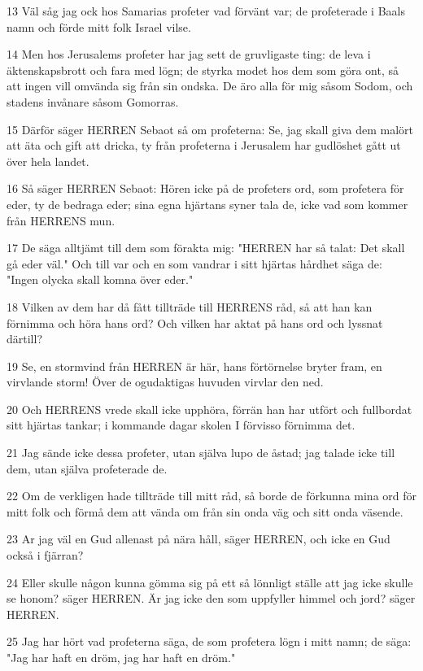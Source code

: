 \par 13 Väl såg jag ock hos Samarias profeter vad förvänt var; de profeterade i Baals namn och förde mitt folk Israel vilse.
\par 14 Men hos Jerusalems profeter har jag sett de gruvligaste ting: de leva i äktenskapsbrott och fara med lögn; de styrka modet hos dem som göra ont, så att ingen vill omvända sig från sin ondska. De äro alla för mig såsom Sodom, och stadens invånare såsom Gomorras.
\par 15 Därför säger HERREN Sebaot så om profeterna: Se, jag skall giva dem malört att äta och gift att dricka, ty från profeterna i Jerusalem har gudlöshet gått ut över hela landet.
\par 16 Så säger HERREN Sebaot: Hören icke på de profeters ord, som profetera för eder, ty de bedraga eder; sina egna hjärtans syner tala de, icke vad som kommer från HERRENS mun.
\par 17 De säga alltjämt till dem som förakta mig: "HERREN har så talat: Det skall gå eder väl." Och till var och en som vandrar i sitt hjärtas hårdhet säga de: "Ingen olycka skall komna över eder."
\par 18 Vilken av dem har då fått tillträde till HERRENS råd, så att han kan förnimma och höra hans ord? Och vilken har aktat på hans ord och lyssnat därtill?
\par 19 Se, en stormvind från HERREN är här, hans förtörnelse bryter fram, en virvlande storm! Över de ogudaktigas huvuden virvlar den ned.
\par 20 Och HERRENS vrede skall icke upphöra, förrän han har utfört och fullbordat sitt hjärtas tankar; i kommande dagar skolen I förvisso förnimma det.
\par 21 Jag sände icke dessa profeter, utan själva lupo de åstad; jag talade icke till dem, utan själva profeterade de.
\par 22 Om de verkligen hade tillträde till mitt råd, så borde de förkunna mina ord för mitt folk och förmå dem att vända om från sin onda väg och sitt onda väsende.
\par 23 Ar jag väl en Gud allenast på nära håll, säger HERREN, och icke en Gud också i fjärran?
\par 24 Eller skulle någon kunna gömma sig på ett så lönnligt ställe att jag icke skulle se honom? säger HERREN. Är jag icke den som uppfyller himmel och jord? säger HERREN.
\par 25 Jag har hört vad profeterna säga, de som profetera lögn i mitt namn; de säga: "Jag har haft en dröm, jag har haft en dröm."
